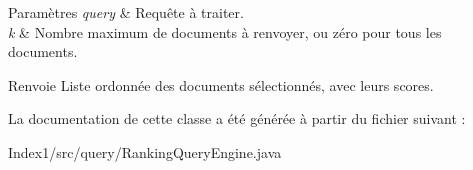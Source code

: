 \begin{DoxyParams}{Paramètres}
{\em query} & Requête à traiter. \\
\hline
{\em k} & Nombre maximum de documents à renvoyer, ou zéro pour tous les documents. \\
\hline
\end{DoxyParams}
\begin{DoxyReturn}{Renvoie}
Liste ordonnée des documents sélectionnés, avec leurs scores. 
\end{DoxyReturn}


La documentation de cette classe a été générée à partir du fichier suivant \+:\begin{DoxyCompactItemize}
\item 
Index1/src/query/Ranking\+Query\+Engine.\+java\end{DoxyCompactItemize}

